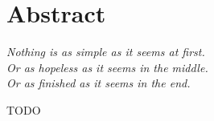 \chapter{Abstract}
\setlength{\epigraphrule}{0pt}
\setlength{\epigraphwidth}{0.48\textwidth}
\epigraph{\textit{Nothing is as simple as it seems at first.\\Or as hopeless as it seems in the middle.\\Or as finished as it seems in the end.}}{}

TODO



